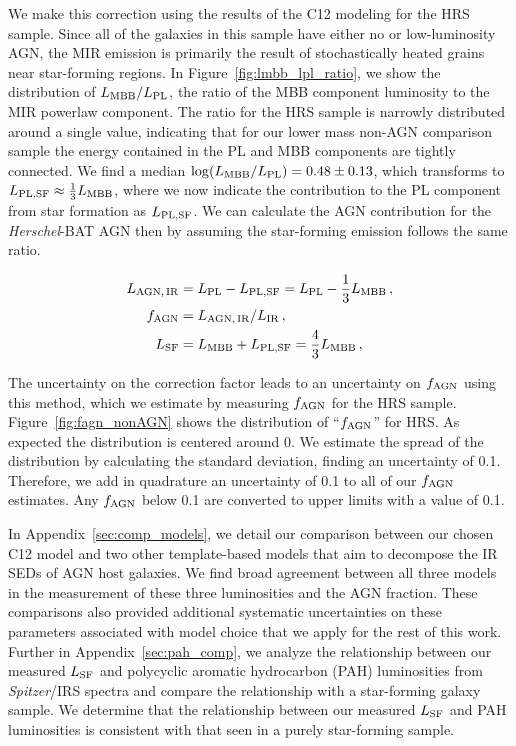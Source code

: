 \documentclass[fleqn, usenatbib]{mnras}
\newcommand{\herschel}{\emph{Herschel}}
\begin{document}
We make this correction using the results of the C12 modeling for the HRS sample. Since all of the galaxies in this sample have either no or low-luminosity AGN, the MIR emission is primarily the result of stochastically heated grains near star-forming regions. In Figure~\ref{fig:lmbb_lpl_ratio}, we show the distribution of $L_{\rm MBB}/L_{\rm PL}$, the ratio of the MBB component luminosity to the MIR powerlaw component. The ratio for the HRS sample is narrowly distributed around a single value, indicating that for our lower mass non-AGN comparison sample the energy contained in the PL and MBB components are tightly connected. We find a median $\log(L_{\rm MBB}/L_{\rm PL})=0.48 \pm 0.13$, which transforms to $L_{\rm PL,SF} \approx \frac{1}{3}L_{\rm MBB}$, where we now indicate the contribution to the PL component from star formation as  $L_{\rm PL,SF}$. We can calculate the AGN contribution for the \herschel-BAT AGN then by assuming the star-forming emission follows the same ratio.

\begin{align}
L_{\rm AGN,\,IR} &= L_{\rm PL} - L_{\rm PL, SF} = L_{\rm PL} - \frac{1}{3}L_{\rm MBB} \label{eq:c12_lagnIR}\,, \\
f_{\rm AGN} &= L_{\rm AGN, \, IR}/L_{\rm IR} \label{eq:c12_fagn}\,, \\
L_{\rm SF} &= L_{\rm MBB} + L_{\rm PL,SF} =  \frac{4}{3}L_{\rm MBB} \label{eq:c12_lsf}\,,
\end{align}

The uncertainty on the correction factor leads to an uncertainty on $f_{\rm AGN}$ using this method, which we estimate by measuring $f_{\rm AGN}$ for the HRS sample. Figure~\ref{fig:fagn_nonAGN} shows the distribution of ``$f_{\rm AGN}$'' for HRS. As expected the distribution is centered around 0. We estimate the spread of the distribution by calculating the standard deviation, finding an uncertainty of 0.1. Therefore, we add in quadrature an uncertainty of 0.1 to all of our $f_{\rm AGN}$ estimates. Any $f_{\rm AGN}$ below 0.1 are converted to upper limits with a value of 0.1. 

In Appendix~\ref{sec:comp_models}, we detail our comparison between our chosen C12 model and two other template-based models that aim to decompose the IR SEDs of AGN host galaxies. We find broad agreement between all three models in the measurement of these three luminosities and the AGN fraction. These comparisons also provided additional systematic uncertainties on these parameters associated with model choice that we apply for the rest of this work. Further in Appendix~\ref{sec:pah_comp}, we analyze the relationship between our measured $L_{\rm SF}$ and polycyclic aromatic hydrocarbon (PAH) luminosities from \textit{Spitzer}/IRS spectra and compare the relationship with a star-forming galaxy sample. We determine that the relationship between our measured $L_{\rm SF}$ and PAH luminosities is consistent with that seen in a purely star-forming sample.
\end{document}
